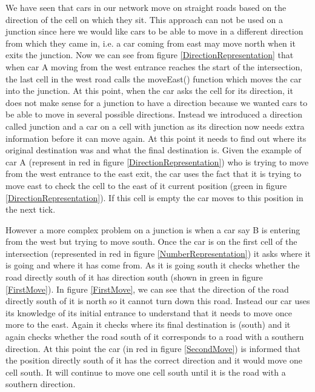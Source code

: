 \documentclass{article}
\begin{document}
We have seen that cars in our network move on straight roads based on the direction of the cell on which  they sit. This approach can not be used on a junction since here we would like cars to be able to move in a different direction from which they came in, i.e. a car coming from east may move north when it exits the junction. Now we can see from figure \ref{DirectionRepresentation} that when car A moving from the west entrance reaches the start of the intersection, the last cell in the west road calls the moveEast() function which moves the car into the junction. At this point, when the car asks the cell for its direction, it does not make sense for a junction to have a direction because we wanted cars to be able to move in several possible directions. Instead we introduced a direction called junction and a car on a cell with junction as its direction now needs extra information before it can move again. At this point it needs to find out where its original destination was and what the final destination is. Given the example of car A (represent in red in figure \ref{DirectionRepresentation}) who is trying to move from the west entrance to the east exit, the car uses the fact that it is trying to move east to check the cell to the east of it current position (green in figure \ref{DirectionRepresentation}). If this cell is empty the car moves to this position in the next tick. 

However a more complex problem on a junction is when a car say B is entering from the west but trying to move south. Once the car is on the first cell of the intersection (represented in red in figure \ref{NumberRepresentation}) it asks where it is going and where it has come from. As it is going south it checks whether the road directly south of it has direction south (shown in green in figure \ref{FirstMove}). In figure \ref{FirstMove}, we can see that the direction of the road directly south of it is north so it cannot turn down this road. Instead our car uses its knowledge of its initial entrance to understand that it needs to move once more to the east. Again it checks where its final destination is (south) and it again checks whether the road south of it corresponds to a road with a southern direction. At this point the car (in red in figure \ref{SecondMove}) is informed that the position directly south of it has the correct direction and it would move one cell south. It will continue to move one cell south until it is the road with a southern direction. 
\end{document}
